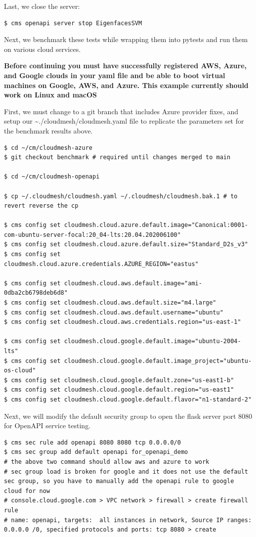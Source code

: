 Last, we close the server:

\begin{verbatim}
$ cms openapi server stop EigenfacesSVM
\end{verbatim}

Next, we benchmark these tests while wrapping them into pytests and run
them on various cloud services.

\textbf{Before continuing you must have successfully registered AWS,
Azure, and Google clouds in your yaml file and be able to boot virtual
machines on Google, AWS, and Azure. This example currently should work
on Linux and macOS}

First, we must change to a git branch that includes Azure provider
fixes, and setup our \textasciitilde./cloudmesh/cloudmesh.yaml file to
replicate the parameters set for the benchmark results above.

\begin{verbatim}
$ cd ~/cm/cloudmesh-azure 
$ git checkout benchmark # required until changes merged to main

$ cd ~/cm/cloudmesh-openapi

$ cp ~/.cloudmesh/cloudmesh.yaml ~/.cloudmesh/cloudmesh.bak.1 # to revert reverse the cp

$ cms config set cloudmesh.cloud.azure.default.image="Canonical:0001-com-ubuntu-server-focal:20_04-lts:20.04.202006100"
$ cms config set cloudmesh.cloud.azure.default.size="Standard_D2s_v3"
$ cms config set cloudmesh.cloud.azure.credentials.AZURE_REGION="eastus"

$ cms config set cloudmesh.cloud.aws.default.image="ami-0dba2cb6798deb6d8"
$ cms config set cloudmesh.cloud.aws.default.size="m4.large"
$ cms config set cloudmesh.cloud.aws.default.username="ubuntu"
$ cms config set cloudmesh.cloud.aws.credentials.region="us-east-1"

$ cms config set cloudmesh.cloud.google.default.image="ubuntu-2004-lts"
$ cms config set cloudmesh.cloud.google.default.image_project="ubuntu-os-cloud"
$ cms config set cloudmesh.cloud.google.default.zone="us-east1-b"
$ cms config set cloudmesh.cloud.google.default.region="us-east1"
$ cms config set cloudmesh.cloud.google.default.flavor="n1-standard-2"
\end{verbatim}

Next, we will modify the default security group to open the flask server
port 8080 for OpenAPI service testing.

\begin{verbatim}
$ cms sec rule add openapi 8080 8080 tcp 0.0.0.0/0
$ cms sec group add default openapi for_openapi_demo
# the above two command should allow aws and azure to work
# sec group load is broken for google and it does not use the default sec group, so you have to manually add the openapi rule to google cloud for now
# console.cloud.google.com > VPC network > firewall > create firewall rule
# name: openapi, targets:  all instances in network, Source IP ranges: 0.0.0.0 /0, specified protocols and ports: tcp 8080 > create
\end{verbatim}

